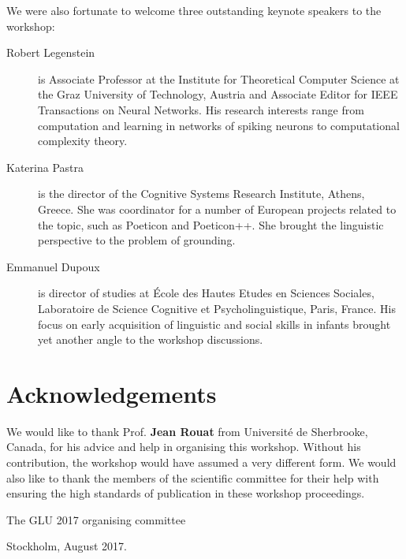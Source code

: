 \documentclass{confproc}
\begin{document}
We were also fortunate to welcome three outstanding keynote speakers to the workshop:
\begin{description}
\item[Robert Legenstein] is Associate Professor at the Institute for Theoretical Computer Science at the Graz University of Technology, Austria and Associate Editor for IEEE Transactions on Neural Networks. His research interests range from computation and learning in networks of spiking neurons to computational complexity theory.
\item[Katerina Pastra] is the director of the Cognitive Systems Research Institute, Athens, Greece. She was coordinator for a number of European projects related to the topic, such as Poeticon and Poeticon++. She brought the linguistic perspective to the problem of grounding.
\item[Emmanuel Dupoux] is director of studies at École des Hautes Etudes en Sciences Sociales, Laboratoire de Science Cognitive et Psycholinguistique, Paris, France. His focus on early acquisition of linguistic and social skills in infants brought yet another angle to the workshop discussions.
\end{description}
\section*{Acknowledgements}
We would like to thank Prof. \textbf{Jean Rouat} from Université de Sherbrooke, Canada, for his advice and help in organising this workshop. Without his contribution, the workshop would have assumed a very different form. We would also like to thank the members of the scientific committee for their help with ensuring the high standards of publication in these workshop proceedings.

\vspace{1cm}
\noindent The GLU 2017 organising committee

\noindent Stockholm, August 2017.

\newpage
\end{document}
